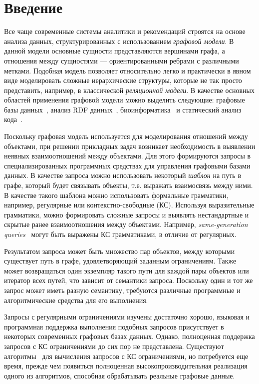 \section*{Введение}

Все чаще современные системы аналитики и рекомендаций строятся на основе анализа данных, структурированных с использованием \textit{графовой модели}. В данной модели основные сущности представляются вершинами графа, а отношения между сущностями --- ориентированными ребрами с различными метками. Подобная модель позволяет относительно легко и практически в явном виде моделировать сложные иерархические структуры, которые не так просто представить, например, в классической \textit{реляционной модели}. В качестве основных областей применения графовой модели можно выделить следующие: графовые базы данных~\cite{article:querying_graph_databases}, анализ RDF данных~\cite{article:cfpq_and_rdf_analysis}, биоинформатика~\cite{article:rna_prediction} и статический анализ кода~\cite{article:dyck_cfl_code_analysis}.

Поскольку графовая модель используется для моделирования отношений между объектами, при решении прикладных задач возникает необходимость в выявлении неявных взаимоотношений между объектами. Для этого  формируются запросы в специализированных программных средствах для управления графовыми базами данных. В качестве запроса можно использовать некоторый \textit{шаблон} на путь в графе, который будет связывать объекты, т.е. выражать взаимосвязь между ними. В качестве такого шаблона можно использовать формальные грамматики, например, регулярные или контекстно-свободные (КС). Используя выразительные грамматики, можно формировать сложные запросы и выявлять нестандартные и скрытые ранее взаимоотношения между объектами. Например, \textit{same-generation queries}~\cite{inbook:databases_intro} могут быть выражены КС грамматиками, в отличие от регулярных.

Результатом запроса может быть множество пар объектов, между которыми существует путь в графе, удовлетворяющий заданным ограничениям. Также может возвращаться один экземпляр такого пути для каждой пары объектов или итератор всех путей, что зависит от семантики запроса. Поскольку один и тот же запрос может иметь разную семантику, требуются различные программные и алгоритмические средства для его выполнения.  

Запросы с регулярными ограничениями изучены достаточно хорошо, языковая и программная поддержка выполнения подобных запросов присутствует в некоторых современных графовых базах данных. Однако, полноценная поддержка запросов с КС ограничениями до сих пор не представлена. Существуют алгоритмы~\cite{article:cfpq_and_rdf_analysis, article:hellings_cfpq, inproceedings:matrix_cfpq, inbook:kronecker_cfpq_adbis, article:cfpq_go_for_rdf} для вычисления запросов с КС ограничениями, но потребуется еще время, прежде чем появиться полноценная высокопроизводительная реализация одного из алгоритмов, способная обрабатывать реальные графовые данные.

